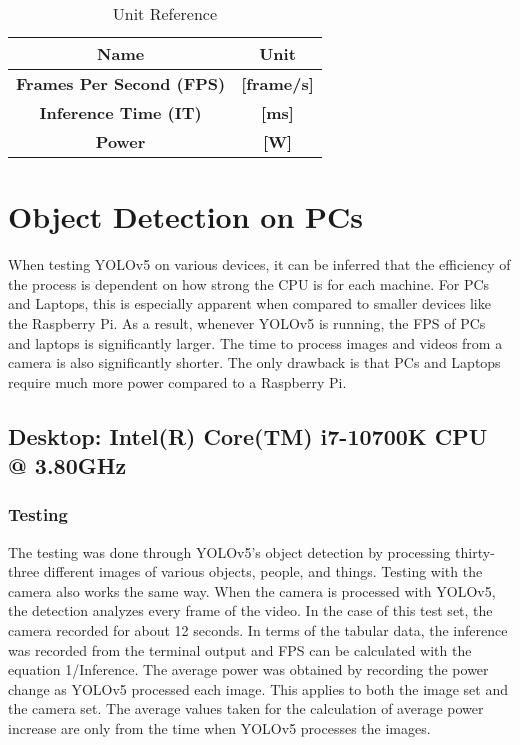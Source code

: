 \documentclass[Report]{IEEEtran}
\begin{document}
\begin{table}[htbp]
\caption{Unit Reference}
\begin{center}
\begin{tabular}{|c|c|}
\hline \textbf{Name}& \textbf{Unit} \\
\hline \textbf{Frames Per Second (FPS)}& \textbf{[frame/s]} \\
\hline \textbf{Inference Time (IT) }& \textbf{[ms]} \\
\hline \textbf{Power}& \textbf{[W]} \\ \hline
\end{tabular}
\label{tab1}
\end{center}
\end{table}

\section{Object Detection on PCs}
When testing YOLOv5 on various devices, it can be inferred that the efficiency of the process is dependent on how strong the CPU is for each machine. For PCs and Laptops, this is especially apparent when compared to smaller devices like the Raspberry Pi. As a result, whenever YOLOv5 is running, the FPS of PCs and laptops is significantly larger. The time to process images and videos from a camera is also significantly shorter. The only drawback is that PCs and Laptops require much more power compared to a Raspberry Pi.

\subsection{Desktop: Intel(R) Core(TM) i7-10700K CPU @ 3.80GHz}

\subsubsection{Testing}
The testing was done through YOLOv5's object detection by processing thirty-three different images of various objects, people, and things. Testing with the camera also works the same way. When the camera is processed with YOLOv5, the detection analyzes every frame of the video. In the case of this test set, the camera recorded for about 12 seconds. In terms of the tabular data, the inference was recorded from the terminal output and FPS can be calculated with the equation 1/Inference. The average power was obtained by recording the power change as YOLOv5 processed each image. This applies to both the image set and the camera set. The average values taken for the calculation of average power increase are only from the time when YOLOv5 processes the images.
\end{document}
